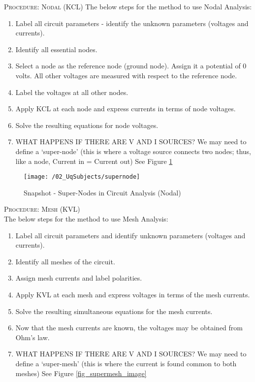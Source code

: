 \textsc{\large Procedure: Nodal (KCL)}
The below steps for the method to use Nodal Analysis:
\begin{enumerate}
  \item Label all circuit parameters - identify the unknown parameters (voltages and currents).
  \item Identify all essential nodes.
  \item Select a node as the reference node (ground node). Assign it a potential of 0 volts. All other voltages are measured with respect to the reference node.
  \item Label the voltages at all other nodes.
  \item Apply KCL at each node and express currents in terms of node voltages.
  \item Solve the resulting equations for node voltages.
  \item WHAT HAPPENS IF THERE ARE V AND I SOURCES?  We may need to define a `super-node' (this is where a voltage source connects two nodes; thus, like a node, Current in = Current out) See Figure \ref{fig_supernode_image}
\end{enumerate}

\begin{figure}
  \texttt{[image: /02\_UqSubjects/supernode]}
  \caption{Snapshot - Super-Nodes in Circuit Analysis (Nodal)}
  \label{fig_supernode_image}
\end{figure}

\textsc{\large Procedure: Mesh (KVL)}\\
The below steps for the method to use Mesh Analysis:
\begin{enumerate}
  \item Label all circuit parameters and identify unknown parameters (voltages and currents).
  \item Identify all meshes of the circuit.
  \item Assign mesh currents and label polarities.
  \item Apply KVL at each mesh and express voltages in terms of the mesh currents.
  \item Solve the resulting simultaneous equations for the mesh currents.
  \item Now that the mesh currents are known, the voltages may be obtained from Ohm's law.
  \item WHAT HAPPENS IF THERE ARE V AND I SOURCES?  We may need to define a `super-mesh' (this is where the current is found common to both meshes) See Figure \ref{fig_supermesh_image}
\end{enumerate}

